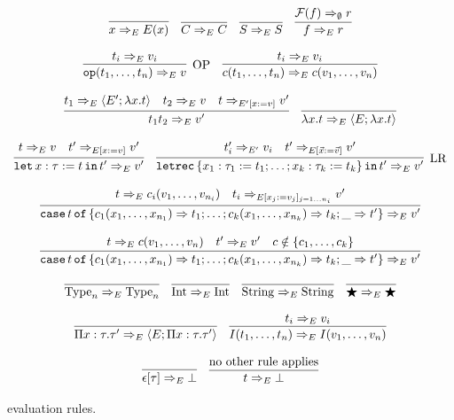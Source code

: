 \documentclass[
    9pt,            %
    techreport,        %
    affiltop,       %
]{art}
\begin{document}
\begin{figure}[H]
\[
\begin{array}{c}
\infer{\eval{x}{E}{E(x)}}{}\quad
\infer{\eval{C}{E}{C}}{}\quad
\infer{\eval{S}{E}{S}}{}\quad
\infer{\eval{f}{E}{r}}{\eval{\Fc(f)}{\emptyset}{r}}
\\ \\
\infer[\mathrm{OP}]{\eval{\op(t_1,\ldots,t_n)}{E}{v}}{\eval{t_i}{E}{v_i}}\quad
\infer{\eval{c(t_1,\ldots,t_n)}{E}{c(v_1,\ldots,v_n)}}{\eval{t_i}{E}{v_i}}
\\ \\
\infer{\eval{t_1 t_2}{E}{v'}}{\eval{t_1}{E}{\closure{E'}{\lambda x . t}} & \eval{t_2}{E}{v} & \eval{t}{E'[x:=v]}{v'}} \quad
\infer{\eval{\lambda x . t}{E}{\closure{E}{\lambda x . t}}}{}
\\ \\
\infer{\eval{\slet{x:\tau := t}{t'}}{E}{v'}}{\eval{t}{E}{v} & \eval{t'}{E[x:=v]}{v'}}\quad
\infer[\mathrm{LR}]{\eval{\sletrec{\{x_1 : \tau_1 := t_1; \ldots; x_k : \tau_k := t_k\}}{t'}}{E}{v'}}{\eval{t_i'}{E'}{v_i} & \eval{t'}{E[\vec{x}:=\vec{v}]}{v'}}
\\ \\
\infer{\eval{\scase{t}{\{c_1(x_1,\ldots,x_{n_1}) \To t_1; \ldots; c_k(x_1,\ldots,x_{n_k}) \To t_k; \_ \To t'\}}}{E}{v'}}{\eval{t}{E}{c_i(v_1,\ldots,v_{n_i})} & \eval{t_i}{E[x_j := v_j]_{j=1\ldots n_i}}{v'}}
\\ \\
\infer{\eval{\scase{t}{\{c_1(x_1,\ldots,x_{n_1}) \To t_1; \ldots; c_k(x_1,\ldots,x_{n_k}) \To t_k; \_ \To t'\}}}{E}{v'}}{\eval{t}{E}{c(v_1,\ldots,v_n)} & \eval{t'}{E}{v'} & c \notin \{c_1,\ldots,c_k\}}
\\ \\
\infer{\eval{\Type_n}{E}{\Type_n}}{}\quad
\infer{\eval{\Int}{E}{\Int}}{}\quad
\infer{\eval{\String}{E}{\String}}{}\quad
\infer{\eval{\Dynamic}{E}{\Dynamic}}{}
\\ \\
\infer{\eval{\Pi x : \tau . \tau'}{E}{\closure{E}{\Pi x : \tau . \tau'}}}{}\quad
\infer{\eval{I(t_1,\ldots,t_n)}{E}{I(v_1,\ldots,v_n)}}{\eval{t_i}{E}{v_i}}
\\ \\
\infer{\eval{\epsilon[\tau]}{E}{\bot}}{}\quad
\infer{\eval{t}{E}{\bot}}{\text{no other rule applies}}
\end{array}
\]
\caption{\JuvixCore{} evaluation rules.}
\label{fig:evaluation}
\end{figure}
\end{document}
